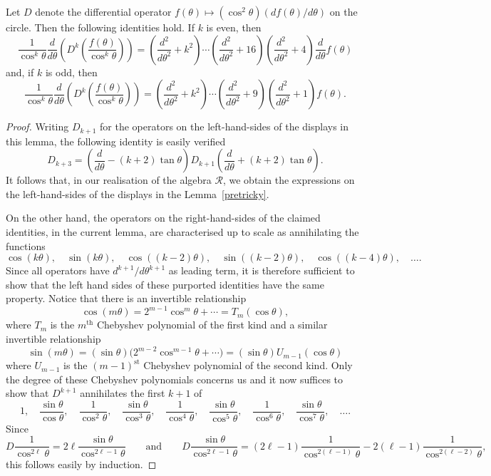 \documentclass[pdftex]{sigma}
\begin{document}
\begin{lemma}\label{tricky} Let $D$ denote the differential operator
$f(\theta)\mapsto (\cos^2\theta)(df(\theta)/d\theta)$ on the circle. Then the
following identities hold. If $k$ is even, then
\[\frac{1}{\cos^k\theta}\frac{d}{d\theta}
\left(D^k\left(\frac{f(\theta)}{\cos^k\theta}\right)\right)
=\left(\frac{d^2}{d\theta^2}+k^2\right)\cdots
\left(\frac{d^2}{d\theta^2}+16\right)
\left(\frac{d^2}{d\theta^2}+4\right)\frac{d}{d\theta}f(\theta)\] and, if $k$ is
odd, then \[\frac{1}{\cos^k\theta}\frac{d}{d\theta}
\left(D^k\left(\frac{f(\theta)}{\cos^k\theta}\right)\right)
=\left(\frac{d^2}{d\theta^2}+k^2\right)\cdots
\left(\frac{d^2}{d\theta^2}+9\right)
\left(\frac{d^2}{d\theta^2}+1\right)f(\theta).\]
\end{lemma}
\begin{proof} Writing $D_{k+1}$ for the operators on the left-hand-sides of the
displays in this lemma,  the following identity is easily verif\/ied
\[
D_{k+3} = \left( \frac{d} { d\theta}
-(k + 2) \tan \theta\right)D_{k+1}\left( \frac{d}{ d \theta} + (k + 2) \tan \theta\right).\]
It follows that, in our realisation of the algebra ${\mathcal{R}}$,
we obtain the expressions on the left-hand-sides of the displays in
the Lemma~\ref{pretricky}.

On the other hand, the operators on the right-hand-sides of the
claimed identities, in the current lemma, are characterised up to scale
as annihilating the functions
\[\cos(k\theta),\quad \sin(k\theta),\quad \cos((k-2)\theta),\quad
\sin((k-2)\theta),\quad \cos((k-4)\theta),\quad \dots.\]
Since all operators have $d^{k+1}/d\theta^{k+1}$ as leading term, it is
therefore suf\/f\/icient to show that the left hand sides of these purported
identities have the same property. Notice that there is an invertible
relationship
\[\cos(m\theta)=2^{m-1}\cos^m\theta+\cdots=T_m(\cos\theta),\]
where $T_m$ is the $m^{\mathrm{th}}$ Chebyshev polynomial of the f\/irst kind
and a similar invertible relationship
\[\sin(m\theta)=(\sin\theta)\big(2^{m-2}\cos^{m-1}\theta+\cdots\big)
=(\sin\theta)U_{m-1}(\cos\theta)\]
where $U_{m-1}$ is the $(m-1)^{\mathrm{st}}$ Chebyshev polynomial of the
second kind. Only the degree of these Chebyshev polynomials concerns us and
it now suf\/f\/ices to show that $D^{k+1}$ annihilates the f\/irst $k+1$ of
\[1,\quad\frac{\sin\theta}{\cos\theta},\quad
\frac{1}{\cos^2\theta},\quad\frac{\sin\theta}{\cos^3\theta},\quad
\frac{1}{\cos^4\theta},\quad\frac{\sin\theta}{\cos^5\theta},\quad
\frac{1}{\cos^6\theta},\quad \frac{\sin\theta}{\cos^7\theta},\quad\dots.\]
Since
\[D\frac{1}{\cos^{2\ell}\theta}=2\ell\frac{\sin\theta}{\cos^{2\ell-1}\theta}
\qquad\mbox{and}\qquad
D\frac{\sin\theta}{\cos^{2\ell-1}\theta}
=(2\ell-1)\frac{1}{\cos^{2(\ell-1)}\theta}
-2(\ell-1)\frac{1}{\cos^{2(\ell-2)}\theta},\]
this follows easily by induction.
\end{proof}
\end{document}

